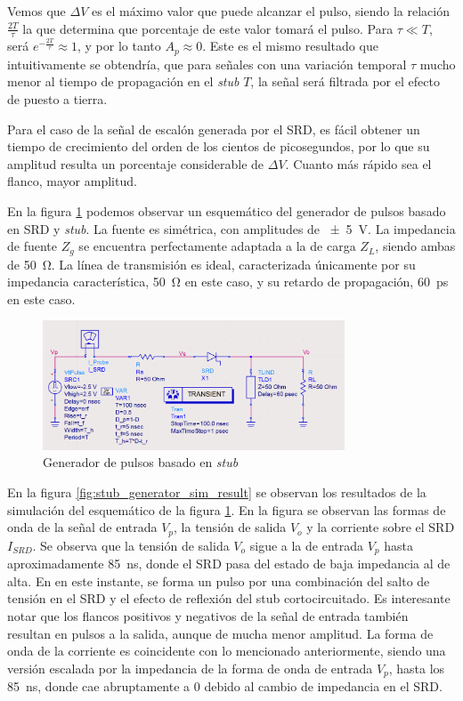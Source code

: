 Vemos que $\Delta V$ es el máximo valor que puede alcanzar el pulso, siendo la
relación $\frac{2T}{\tau}$ la que determina que porcentaje de este valor tomará
el pulso. Para $ \tau \ll T $, será $e^{-\frac{2T}{\tau}} \approx 1$, y por lo
tanto $A_p \approx 0$. Este es el mismo resultado que intuitivamente se
obtendría, que para señales con una variación temporal $\tau$ mucho menor al
tiempo de propagación en el \textit{stub} $T$, la señal será filtrada por el
efecto de puesto a tierra.

Para el caso de la señal de escalón generada por el SRD, es fácil obtener un
tiempo de crecimiento del orden de los cientos de picosegundos, por lo que su
amplitud resulta un porcentaje considerable de $\Delta V$. Cuanto más rápido sea
el flanco, mayor amplitud.

En la figura \ref{fig:stub_generator_circuit} podemos observar un esquemático
del generador de pulsos basado en SRD y \textit{stub}. La fuente es simétrica,
con amplitudes de \qty{\pm 5}{\volt}. La impedancia de fuente $Z_g$ se encuentra
perfectamente adaptada a la de carga $Z_L$, siendo ambas de \qty{50}{\ohm}. La
línea de transmisión es ideal, caracterizada únicamente por su impedancia
característica, \qty{50}{\ohm} en este caso, y su retardo de propagación,
\qty{60}{\pico\second} en este caso.

\begin{figure}[tbp]
    \centering
    \includegraphics[width=0.8\textwidth]{images/stub_generator_circuit.png}
    \caption{Generador de pulsos basado en \textit{stub}}
    \label{fig:stub_generator_circuit}
\end{figure}

En la figura \ref{fig:stub_generator_sim_result} se observan los resultados de
la simulación del esquemático de la figura \ref{fig:stub_generator_circuit}. En
la figura  se observan las formas de onda de la señal de entrada $V_p$, la
tensión de salida $V_o$ y la corriente sobre el SRD $I_{SRD}$. Se observa que la
tensión de salida $V_o$ sigue a la de entrada $V_p$ hasta aproximadamente
\qty{85}{\nano\second}, donde el SRD pasa del estado de baja impedancia al de
alta. En en este instante, se forma un pulso por una combinación del salto de
tensión en el SRD y el efecto de reflexión del stub cortocircuitado. Es
interesante notar que los flancos positivos y negativos de la señal de entrada
también resultan en pulsos a la salida, aunque de mucha menor amplitud. La forma
de onda de la corriente es coincidente con lo mencionado anteriormente, siendo
una versión escalada por la impedancia de la forma de onda de entrada $V_p$,
hasta los \qty{85}{\nano\second}, donde cae abruptamente a $0$ debido al cambio
de impedancia en el SRD.

